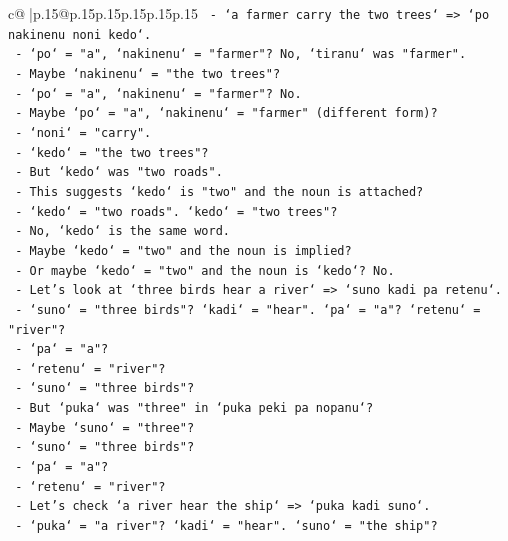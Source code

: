 \documentclass{article}
\begin{document}
{\begin{supertabular}{c@{$\;$}|p{.15\linewidth}@{}p{.15\linewidth}p{.15\linewidth}p{.15\linewidth}p{.15\linewidth}p{.15\linewidth}}
{{{\texttt{         {-} `a farmer carry the two trees` => `po nakinenu noni kedo`.} \\
\texttt{           {-} `po` = "a", `nakinenu` = "farmer"? No, `tiranu` was "farmer".} \\
\texttt{           {-} Maybe `nakinenu` = "the two trees"?} \\
\texttt{           {-} `po` = "a", `nakinenu` = "farmer"? No.} \\
\texttt{           {-} Maybe `po` = "a", `nakinenu` = "farmer" (different form)?} \\
\texttt{           {-} `noni` = "carry".} \\
\texttt{           {-} `kedo` = "the two trees"?} \\
\texttt{           {-} But `kedo` was "two roads".} \\
\texttt{           {-} This suggests `kedo` is "two" and the noun is attached?} \\
\texttt{           {-} `kedo` = "two roads". `kedo` = "two trees"?} \\
\texttt{           {-} No, `kedo` is the same word.} \\
\texttt{           {-} Maybe `kedo` = "two" and the noun is implied?} \\
\texttt{           {-} Or maybe `kedo` = "two" and the noun is `kedo`? No.} \\
\texttt{           {-} Let's look at `three birds hear a river` => `suno kadi pa retenu`.} \\
\texttt{             {-} `suno` = "three birds"? `kadi` = "hear". `pa` = "a"? `retenu` = "river"?} \\
\texttt{             {-} `pa` = "a"?} \\
\texttt{             {-} `retenu` = "river"?} \\
\texttt{             {-} `suno` = "three birds"?} \\
\texttt{             {-} But `puka` was "three" in `puka peki pa nopanu`?} \\
\texttt{             {-} Maybe `suno` = "three"?} \\
\texttt{             {-} `suno` = "three birds"?} \\
\texttt{             {-} `pa` = "a"?} \\
\texttt{             {-} `retenu` = "river"?} \\
\texttt{             {-} Let's check `a river hear the ship` => `puka kadi suno`.} \\
\texttt{               {-} `puka` = "a river"? `kadi` = "hear". `suno` = "the ship"?} \\
}}}
\end{supertabular}}
\end{document}
